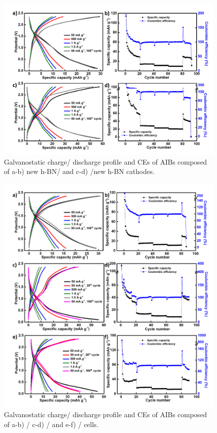 \begin{figure}[tbh!]
\centering
\includegraphics[width=\textwidth]{Figures/BOhBN/BNdifO}
\caption{Galvanostatic charge/ discharge profile and CEs of AIBs composed of a-b) new h-BN/ and c-d) /new h-BN cathodes.}
\label{Figures/BOhBN:BNdifO}
\end{figure}

\begin{figure}[tbh!]
\centering
\includegraphics[width=\textwidth]{Figures/BOhBN/othON}
\caption{Galvanostatic charge/ discharge profile and CEs of AIBs composed of a-b) / c-d) / and e-f) / cells.}
\label{Figures/BOhBN:othON}
\end{figure}

